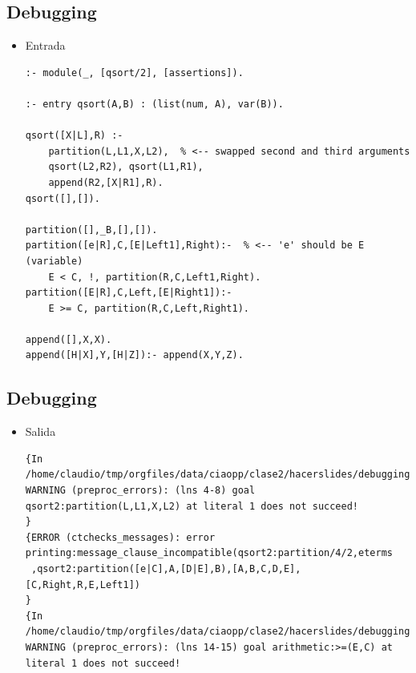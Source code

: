 \documentclass[11pt]{article}
\begin{document}
\subsection*{Debugging}
\label{sec:org76066a1}
\begin{itemize}
\item Entrada
\begin{verbatim}
:- module(_, [qsort/2], [assertions]).

:- entry qsort(A,B) : (list(num, A), var(B)).

qsort([X|L],R) :-
    partition(L,L1,X,L2),  % <-- swapped second and third arguments
    qsort(L2,R2), qsort(L1,R1),
    append(R2,[X|R1],R).
qsort([],[]).

partition([],_B,[],[]).
partition([e|R],C,[E|Left1],Right):-  % <-- 'e' should be E (variable)
    E < C, !, partition(R,C,Left1,Right).
partition([E|R],C,Left,[E|Right1]):-
    E >= C, partition(R,C,Left,Right1).

append([],X,X).
append([H|X],Y,[H|Z]):- append(X,Y,Z).
\end{verbatim}
\end{itemize}


\subsection*{Debugging}
\label{sec:org71c04f2}
\begin{itemize}
\item Salida
\begin{verbatim}
{In /home/claudio/tmp/orgfiles/data/ciaopp/clase2/hacerslides/debugging/qsort2.pl
WARNING (preproc_errors): (lns 4-8) goal qsort2:partition(L,L1,X,L2) at literal 1 does not succeed!
}
{ERROR (ctchecks_messages): error printing:message_clause_incompatible(qsort2:partition/4/2,eterms
 ,qsort2:partition([e|C],A,[D|E],B),[A,B,C,D,E],[C,Right,R,E,Left1])
}
{In /home/claudio/tmp/orgfiles/data/ciaopp/clase2/hacerslides/debugging/qsort2.pl
WARNING (preproc_errors): (lns 14-15) goal arithmetic:>=(E,C) at
literal 1 does not succeed!
\end{verbatim}
\end{itemize}
\end{document}
